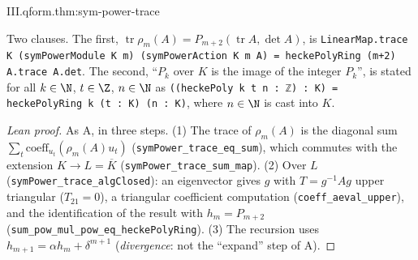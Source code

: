 \begin{theorem}
\end{theorem}
\begin{tfformal}{III.qform.thm:sym-power-trace}
\begin{tffidelity}
Two clauses. The first, $\operatorname{tr}\rho_m(A)=P_{m+2}(\operatorname{tr}A,\det A)$, is \texttt{LinearMap.trace K (symPowerModule K m) (symPowerAction K m A) = heckePolyRing (m+2) A.trace A.det}. The second, ``$P_k$ over $K$ is the image of the integer $P_k$'', is stated for all $k\in\N$, $t\in\Z$, $n\in\N$ as \texttt{((heckePoly k t n : ℤ) : K) = heckePolyRing k (t : K) (n : K)}, where $n\in\N$ is cast into $K$.
\end{tffidelity}
\end{tfformal}
\begin{proof}[Lean proof]
As A, in three steps. (1) The trace of $\rho_m(A)$ is the diagonal sum $\sum_t\mathrm{coeff}_{u_t}(\rho_m(A)u_t)$ (\texttt{symPower\_trace\_eq\_sum}), which commutes with the extension $K\to L=\overline K$ (\texttt{symPower\_trace\_sum\_map}). (2) Over $L$ (\texttt{symPower\_trace\_algClosed}): an eigenvector gives $g$ with $T=g^{-1}Ag$ upper triangular ($T_{21}=0$), a triangular coefficient computation (\texttt{coeff\_aeval\_upper}), and the identification of the result with $h_m=P_{m+2}$ (\texttt{sum\_pow\_mul\_pow\_eq\_heckePolyRing}). (3) The recursion uses $h_{m+1}=\alpha h_m+\delta^{m+1}$ (\emph{divergence}: not the ``expand'' step of A).
\end{proof}

